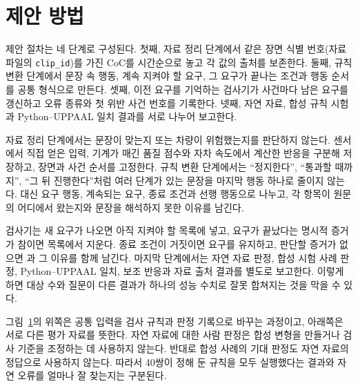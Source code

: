 \section{제안 방법}
\label{sec:method}

제안 절차는 네 단계로 구성된다. 첫째, 자료 정리 단계에서 같은 장면 식별 번호(자료 파일의 \texttt{clip\_id})를 가진 CoC를 시간순으로 놓고 각 값의 출처를 보존한다. 둘째, 규칙 변환 단계에서 문장 속 행동, 계속 지켜야 할 요구, 그 요구가 끝나는 조건과 행동 순서를 공통 형식으로 만든다. 셋째, 이전 요구를 기억하는 검사기가 사건마다 남은 요구를 갱신하고 오류 종류와 첫 위반 사건 번호를 기록한다. 넷째, 자연 자료, 합성 규칙 시험과 Python--UPPAAL 일치 결과를 서로 나누어 보고한다.

자료 정리 단계에서는 문장이 맞는지 또는 차량이 위험했는지를 판단하지 않는다. 센서에서 직접 얻은 입력, 기계가 매긴 품질 점수와 자차 속도에서 계산한 반응을 구분해 저장하고, 장면과 사건 순서를 고정한다. 규칙 변환 단계에서는 ``정지한다'', ``통과할 때까지'', ``그 뒤 진행한다''처럼 여러 단계가 있는 문장을 마지막 행동 하나로 줄이지 않는다. 대신 요구 행동, 계속되는 요구, 종료 조건과 선행 행동으로 나누고, 각 항목이 원문의 어디에서 왔는지와 문장을 해석하지 못한 이유를 남긴다.

검사기는 새 요구가 나오면 아직 지켜야 할 목록에 넣고, 요구가 끝났다는 명시적 증거가 참이면 목록에서 지운다. 종료 조건이 거짓이면 요구를 유지하고, 판단할 증거가 없으면 {\unknown}과 그 이유를 함께 남긴다. 마지막 단계에서는 자연 자료 판정, 합성 시험 사례 판정, Python--UPPAAL 일치, 보조 반응과 자료 출처 결과를 별도로 보고한다. 이렇게 하면 대상 수와 질문이 다른 결과가 하나의 성능 수치로 잘못 합쳐지는 것을 막을 수 있다.

\begin{figure}[t]
\centering

\label{fig:method-pipeline}
\end{figure}

그림~\ref{fig:method-pipeline}의 위쪽은 공통 입력을 검사 규칙과 판정 기록으로 바꾸는 과정이고, 아래쪽은 서로 다른 평가 자료를 뜻한다. 자연 자료에 대한 사람 판정은 합성 변형을 만들거나 검사 기준을 조정하는 데 사용하지 않는다. 반대로 합성 사례의 기대 판정도 자연 자료의 정답으로 사용하지 않는다. 따라서 40쌍이 정해 둔 규칙을 모두 실행했다는 결과와 자연 오류를 얼마나 잘 찾는지는 구분된다.

